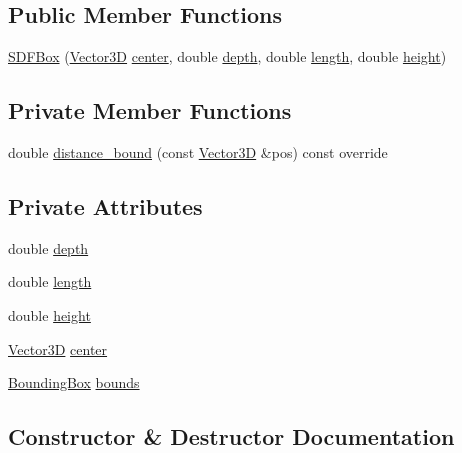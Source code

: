 \subsection*{Public Member Functions}
\begin{DoxyCompactItemize}
\item 
\mbox{\hyperlink{classSDFBox_a6b77f5c17997acf4155c29f55636a575}{S\+D\+F\+Box}} (\mbox{\hyperlink{classVector3D}{Vector3D}} \mbox{\hyperlink{classSDFBox_ab3c5b09a3c42843c995e28c3ee766c01}{center}}, double \mbox{\hyperlink{classSDFBox_a2e6708728c6bcadde76fdec645759ec7}{depth}}, double \mbox{\hyperlink{classSDFBox_a4e1fe9cab3361dcb2e57e5c639d1d56d}{length}}, double \mbox{\hyperlink{classSDFBox_a4be5004a92e2e6af1391287d46539a90}{height}})
\end{DoxyCompactItemize}
\subsection*{Private Member Functions}
\begin{DoxyCompactItemize}
\item 
double \mbox{\hyperlink{classSDFBox_aaeab9858412c2f3ad7e19ec9738e8aca}{distance\+\_\+bound}} (const \mbox{\hyperlink{classVector3D}{Vector3D}} \&pos) const override
\end{DoxyCompactItemize}
\subsection*{Private Attributes}
\begin{DoxyCompactItemize}
\item 
double \mbox{\hyperlink{classSDFBox_a2e6708728c6bcadde76fdec645759ec7}{depth}}
\item 
double \mbox{\hyperlink{classSDFBox_a4e1fe9cab3361dcb2e57e5c639d1d56d}{length}}
\item 
double \mbox{\hyperlink{classSDFBox_a4be5004a92e2e6af1391287d46539a90}{height}}
\item 
\mbox{\hyperlink{classVector3D}{Vector3D}} \mbox{\hyperlink{classSDFBox_ab3c5b09a3c42843c995e28c3ee766c01}{center}}
\item 
\mbox{\hyperlink{classBoundingBox}{Bounding\+Box}} \mbox{\hyperlink{classSDFBox_a3cb36bcbfc2b009bec6d2880ac3e93f0}{bounds}}
\end{DoxyCompactItemize}


\subsection{Constructor \& Destructor Documentation}
\mbox{\label{classSDFBox_a6b77f5c17997acf4155c29f55636a575}} 
